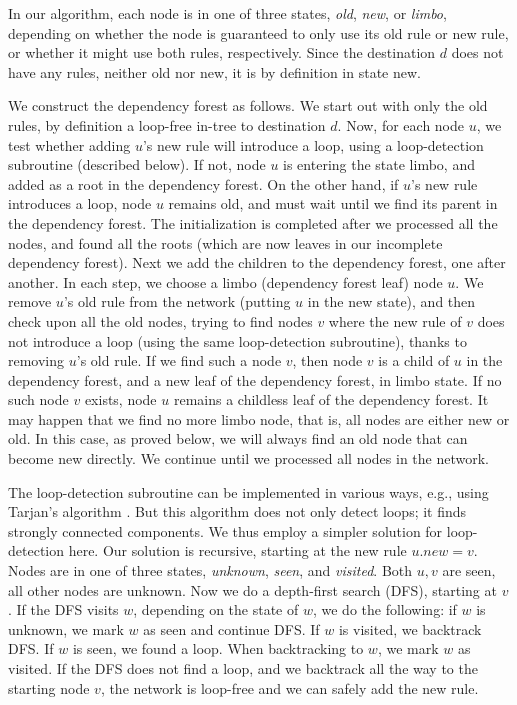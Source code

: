 In our algorithm, each node is in one of three states, \emph{old}, \emph{new}, or \emph{limbo}, depending on whether the node is guaranteed to only use its old rule or new rule, or whether it might use both rules, respectively. Since the destination $d$ does not have any rules, neither old nor new, it is by definition in state new.

We construct the dependency forest as follows. We start out with only the old rules, by definition a loop-free in-tree to destination $d$. Now, for each node $u$, we test whether adding $u$'s new rule will introduce a loop, using a loop-detection subroutine (described below). If not, node $u$ is entering the state limbo, and added as a root in the dependency forest. On the other hand, if $u$'s new rule introduces a loop, node $u$ remains old, and must wait until we find its parent in the dependency forest. The initialization is completed after we processed all the nodes, and found all the roots (which are now leaves in our incomplete dependency forest). Next we add the children to the dependency forest, one after another. In each step, we choose a limbo (dependency forest leaf) node $u$. We remove $u$'s old rule from the network (putting $u$ in the new state), and then check upon all the old nodes, trying to find nodes $v$ where the new rule of $v$ does not introduce a loop (using the same loop-detection subroutine), thanks to removing $u$'s old rule. If we find such a node $v$, then node $v$ is a child of $u$ in the dependency forest, and a new leaf of the dependency forest, in limbo state. If no such node $v$ exists, node $u$ remains a childless leaf of the dependency forest. It may happen that we find no more limbo node, that is, all nodes are either new or old. In this case, as proved below, we will always find an old node that can become new directly.
We continue until we processed all nodes in the network.


The loop-detection subroutine can be implemented in various ways, e.g., using
Tarjan's algorithm \cite{tarjan72}. But this algorithm does not only detect loops; it finds strongly connected components. We thus employ a simpler solution for loop-detection here. Our solution is recursive, starting at the new rule $u.new = v$. Nodes are in one of three states, \emph{unknown}, \emph{seen}, and \emph{visited}. Both $u,v$ are seen, all other nodes are unknown. Now we do a depth-first search (DFS), starting at $v$. If the DFS visits $w$, depending on the state of $w$, we do the following: if $w$ is unknown, we mark $w$ as seen and continue DFS. If $w$ is visited, we backtrack DFS. If $w$ is seen, we found a loop. When backtracking to $w$, we mark $w$ as visited. If the DFS does not find a loop, and we backtrack all the way to the starting node $v$, the network is loop-free and we can safely add the new rule.


